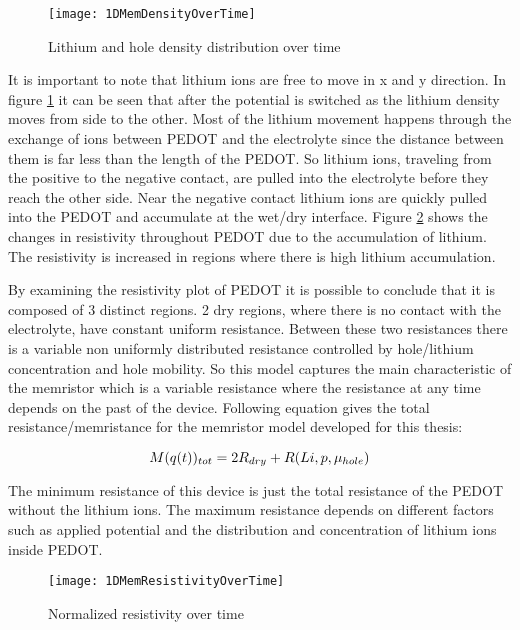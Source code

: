 \begin{doublespace}
\begin{figure}[!htp]
\centering
\texttt{[image: 1DMemDensityOverTime]}
\caption{Lithium and hole density distribution over time} 
\label{MempLi}
\end{figure}

It is important to note that lithium ions are free to move in x and y direction. In figure \ref{MempLi} it can be seen that after the potential is switched as the lithium density moves from  side to the other. Most of the lithium movement happens through the exchange of ions between PEDOT and the electrolyte since the distance between them is far less than the length of the PEDOT. So lithium ions, traveling from the positive to the negative contact, are pulled into the electrolyte before they reach the other side. Near the negative contact lithium ions are quickly pulled into the PEDOT and accumulate at the wet/dry interface. Figure \ref{MemResistivityTrain} shows the changes in resistivity throughout PEDOT due to the accumulation of lithium. The resistivity is increased in regions where there is high lithium accumulation. 

By examining the resistivity plot of PEDOT it is possible to conclude that it is composed of 3 distinct regions. 2 dry regions, where there is no contact with the electrolyte, have constant uniform resistance. Between these two resistances there is a variable non uniformly distributed resistance controlled by hole/lithium concentration and hole mobility. So this model captures the main characteristic of the memristor which is a variable resistance where the resistance at any time depends on the past of the device. Following equation gives the total resistance/memristance for the memristor model developed for this thesis:

\begin{equation}
\centering
M(q(t))_{tot}=2R_{dry}+R(Li,p,\mu_{hole})
\end{equation}

The minimum resistance of this device is just the total resistance of the PEDOT without the lithium ions. The maximum resistance depends on different factors such as applied potential and the distribution and concentration of lithium ions inside PEDOT.

\begin{figure}[!htp]
\centering
\texttt{[image: 1DMemResistivityOverTime]}
\caption{Normalized resistivity over time} 
\label{MemResistivityTrain}
\end{figure}


\end{doublespace}
